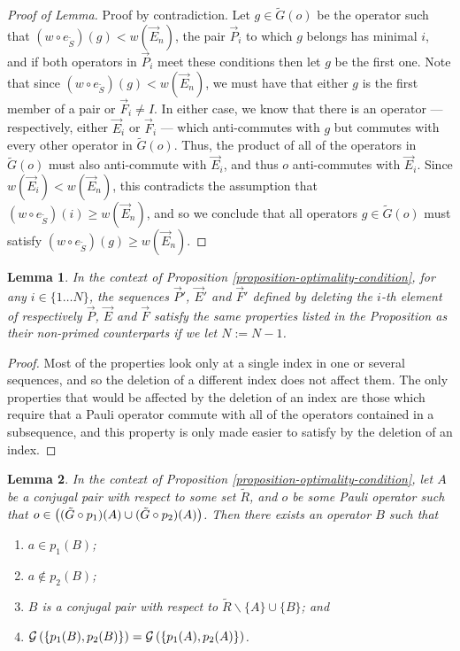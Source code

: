 \documentclass[twocolumn,showpacs,preprintnumbers,amsmath,amssymb,nofootinbib,pra,floatfix]{revtex4-1}
\newtheorem{lemma}{Lemma}
\newcommand{\lst}{\vec}
\newcommand{\set}{\tilde}
\newcommand{\genfun}{\mathcal{G}}
\begin{document}
\begin{proof}[Proof of Lemma]
Proof by contradiction.  Let $g\in \set G(o)$ be the operator such that $(w\circ e_{\set S})(g)<w(\lst E_n)$, the pair $\lst P_i$ to which $g$ belongs has minimal $i$, and if both operators in $\lst P_i$ meet these conditions then let $g$ be the first one.  Note that since $(w\circ e_{\set S})(g)<w(\lst E_n)$, we must have that either $g$ is the first member of a pair or $\lst F_i\ne I$.  In either case, we know that there is an operator --- respectively, either $\lst E_i$ or $\lst F_i$ --- which anti-commutes with $g$ but commutes with every other operator in $\set G(o)$.  Thus, the product of all of the operators in $\set G(o)$ must also anti-commute with $\lst E_i$, and thus $o$ anti-commutes with $\lst E_i$.  Since $w(\lst E_i)<w(\lst E_n)$, this contradicts the assumption that $(w\circ e_{\set S})(i)\ge w(\lst E_n)$, and so we conclude that all operators $g\in\set G(o)$ must satisfy $(w\circ e_{\set S})(g)\ge w(\lst E_n)$.
\end{proof}
\begin{lemma}
In the context of Proposition \ref{proposition-optimality-condition}, for any $i\in\{1\dots N\}$, the sequences $\lst P'$, $\lst E'$ and $\lst F'$ defined by deleting the $i$-th element of respectively $\lst P$, $\lst E$ and $\lst F$ satisfy the same properties listed in the Proposition as their non-primed counterparts if we let $N:=N-1$.
\end{lemma}

\begin{proof}
Most of the properties look only at a single index in one or several sequences, and so the deletion of a different index does not affect them.  The only properties that would be affected by the deletion of an index are those which require that a Pauli operator commute with all of the operators contained in a subsequence, and this property is only made easier to satisfy by the deletion of an index.
\end{proof}
\begin{lemma}
\label{single-pair-rearrangement}
In the context of Proposition \ref{proposition-optimality-condition}, let $A$ be a conjugal pair with respect to some set $\set R$, and $o$ be some Pauli operator such that $o\in\paren{(\set G\circ p_1)(A) \cup (\set G\circ p_2)(A)}$.  Then there exists an operator $B$ such that
\begin{enumerate}
\item $a\in p_1(B)$;
\item $a\notin p_2(B)$;
\item $B$ is a conjugal pair with respect to $\set R\backslash \{A\}\cup\{B\}$; and
\item $\genfun\paren{\{p_1(B),p_2(B)\}} = \genfun\paren{\{p_1(A),p_2(A)\}}$.
\end{enumerate}
\end{lemma}
\end{document}
